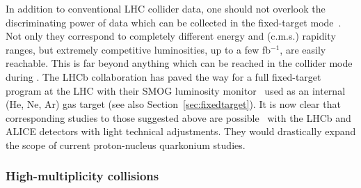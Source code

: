 \documentclass[../report.tex]{subfiles}
\begin{document}

In addition to conventional LHC collider data, one should not overlook the discriminating power of data which can be collected in the fixed-target mode~\cite{Brodsky:2012vg,Lansberg:2012kf}. Not only they correspond to completely different energy and (c.m.s.) rapidity ranges, but extremely competitive luminosities, up to a few fb$^{-1}$, are easily reachable. This is far beyond anything which can be reached in the collider mode during \RunsThreeFour. The LHCb collaboration has paved the way for a full fixed-target program at the LHC with their SMOG luminosity monitor~\cite{FerroLuzzi:2005em} used as an internal (He, Ne, Ar) gas target \cite{Aaij:2018ogq} (see also Section~\ref{sec:fixedtarget}). It is now clear that corresponding studies to those suggested above are possible~\cite{Hadjidakis:2018ifr} with the LHCb and ALICE detectors with light technical adjustments. They would drastically expand the scope of current proton-nucleus quarkonium studies.

\subsubsection{High-multiplicity \pp collisions} %
\end{document}
